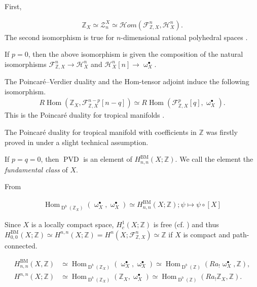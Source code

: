 \documentclass[a4paper,dvipdfmx,reqno,12pt]{amsart}
\theoremstyle{definition}
\newcommand{\Z}{\mathbb{Z}}%
\newcommand{\opn}[1]{\operatorname{#1}}
\numberwithin{equation}{section}
\begin{document}
First, 



\begin{align}
\mathbb{Z}_X \simeq\mathscr{Z}_n^{X}\simeq 
\mathcal{H}om(\mathcal{F}^{n}_{\mathbb{Z},X},
\mathcal{H}^{n}_X).
\end{align}
The second isomorphism is true for $n$-dimensional rational polyhedral 
spaces \cite[Proposition 5.1]{gross2019sheaftheoretic}.

If $p=0$, then the above isomorphism is given the 
composition of the natural isomorphisms 
$\mathcal{F}^{n}_{\mathbb{Z},X}\to \mathcal{H}^{n}_X$ and 
$\mathcal{H}^{n}_X[n]\to \upomega_X^{\bullet}$.



The Poincar\'e--Verdier duality and the 
Hom-tensor adjoint induce
the following isomorphism.
\begin{align}
R\opn{Hom}(\mathbb{Z}_X,
\mathcal{F}_{\mathbb{Z},X}^{n-p}[n-q])\simeq 
R\opn{Hom}(\mathcal{F}_{\mathbb{Z},X}^{p}[q],
\upomega_{X}^{\bullet}).
\end{align}
This is the Poincar\'e duality
for tropical manifolds 
\cite[Corollary 6.3]{gross2019sheaftheoretic}.

The Poincar\'e duality for tropical manifold
with coefficients in $\mathbb{Z}$ was firstly 
proved in \cite[Theorem 5.3]{MR3894860}
under a slight technical assumption.

If $p=q=0$, then $\opn{PVD}$ is an element of 
$H_{n,n}^{\opn{BM}}(X;\mathbb{Z})$. 
We call the element the \emph{fundamental class} of $X$.

From 

\begin{align}
\opn{Hom}_{\opn{D}^{b}(\Z_X)}
(\upomega_X^{\bullet},\upomega_X^{\bullet})\simeq H_{n,n}^{\mathrm{BM}}(X;\mathbb{Z}) ; \psi \mapsto \psi\circ [X]
\end{align}

Since $X$ is a locally compact space, 
$H^{1}_c(X;\Z)$ is free 
(cf. 
\cite[VI. Proposition 5.3]{iversenCohomologySheaves1986a})
and thus $H_{0,0}^{\opn{BM}}(X;\Z)\simeq 
H^{n,n}(X;\Z)=H^{n}(X;
\mathcal{F}_{\mathbb{Z},X}^{n})\simeq \Z$ if 
$X$ is compact and path-connected.

\begin{align}
H^{\opn{BM}}_{n,n}(X,\Z)&\simeq 
\opn{Hom}_{\opn{D}^{b}(\Z_X)}
(\upomega_X^{\bullet},\upomega_X^{\bullet})\simeq
 \opn{Hom}_{\opn{D}^{b}(\Z)}(Ra_!\upomega_X^{\bullet},\Z), \\ 
H^{n,n}(X;\mathbb{Z})&\simeq 
\opn{Hom}_{\opn{D}^{b}(\Z_X)}(\mathbb{Z}_X,
\upomega_X^{\bullet})
\simeq  \opn{Hom}_{\opn{D}^{b}(\Z)}(Ra_!\Z_X,\Z).
\end{align}
\end{document}
